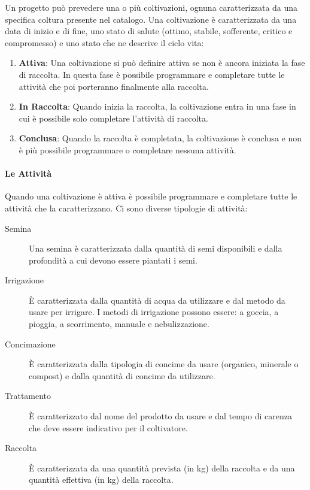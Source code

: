 \documentclass[12pt,a4paper]{article}
\begin{document}
Un progetto può prevedere una o più coltivazioni, ognuna caratterizzata da una specifica
coltura presente nel catalogo. Una coltivazione è caratterizzata da una data di inizio e di
fine, uno stato di salute (ottimo, stabile, sofferente, critico e compromesso) e uno stato
che ne descrive il ciclo vita:

\begin{enumerate}
    \item \textbf{Attiva}: Una coltivazione si può definire attiva se non è ancora iniziata
        la fase di raccolta. In questa fase è possibile programmare e completare tutte le
        attività che poi porteranno finalmente alla raccolta.
    \item \textbf{In Raccolta}: Quando inizia la raccolta, la coltivazione entra in una fase
        in cui è possibile solo completare l'attività di raccolta.
    \item \textbf{Conclusa}: Quando la raccolta è completata, la coltivazione è conclusa e
        non è più possibile programmare o completare nessuna attività.
\end{enumerate}

\paragraph{Le Attività}

Quando una coltivazione è attiva è possibile programmare e completare tutte le attività che
la caratterizzano. Ci sono diverse tipologie di attività:

\begin{description}
    \item[Semina] Una semina è caratterizzata dalla quantità di semi disponibili e dalla
        profondità a cui devono essere piantati i semi.
    \item[Irrigazione] È caratterizzata dalla quantità di acqua da utilizzare e dal metodo
        da usare per irrigare. I metodi di irrigazione possono essere: a goccia, a pioggia,
        a scorrimento, manuale e nebulizzazione.
    \item[Concimazione] È caratterizzata dalla tipologia di concime da usare (organico,
        minerale o compost) e dalla quantità di concime da utilizzare.
    \item[Trattamento] È caratterizzato dal nome del prodotto da usare e dal tempo di
        carenza che deve essere indicativo per il coltivatore.
    \item[Raccolta] È caratterizzata da una quantità prevista (in kg) della raccolta e da
        una quantità effettiva (in kg) della raccolta.
\end{description}
\end{document}
